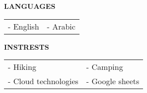 \medskip
\divider

\textcolor{VividPurple}{\textbf{LANGUAGES}}
\medskip

\begin{tabular}{ l l } 
	- English & - Arabic \\
\end{tabular}  


\divider

\textcolor{VividPurple}{\textbf{INSTRESTS}}
\medskip

\begin{tabular}{ l l } 
	- Hiking             & - Camping       \\
	- Cloud technologies & - Google sheets \\
\end{tabular}


\medskip
\medskip

\mbox{}\hfill \small \href{https://github.com/MichaelSafwatHanna/cv}{\textcolor{accent}{\faCode}}